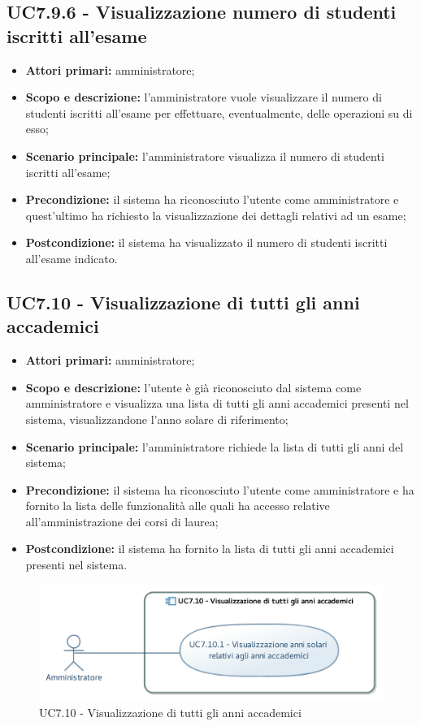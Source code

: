 \documentclass[AnalisiDeiRequisiti.tex]{subfiles}
\begin{document}
\subsection{UC7.9.6 - Visualizzazione numero di studenti iscritti all'esame}
\begin{itemize}
	\item \textbf{Attori primari:} amministratore;
	\item \textbf{Scopo e descrizione:} l'amministratore vuole visualizzare il numero di studenti iscritti all'esame per effettuare, eventualmente, delle operazioni su di esso;
	\item \textbf{Scenario principale:} l'amministratore visualizza il numero di studenti iscritti all'esame;
	\item \textbf{Precondizione:} il sistema ha riconosciuto l'utente come amministratore e quest'ultimo ha richiesto la visualizzazione dei dettagli relativi ad un esame; 
	\item \textbf{Postcondizione:} il sistema ha visualizzato il numero di studenti iscritti all'esame indicato.
\end{itemize}
\subsection{UC7.10 - Visualizzazione di tutti gli anni accademici}
\begin{itemize}
	\item \textbf{Attori primari:} amministratore;
	\item \textbf{Scopo e descrizione:} l'utente è già riconosciuto dal sistema come amministratore e visualizza una lista di tutti gli anni accademici presenti nel sistema, visualizzandone l'anno solare di riferimento;
	\item \textbf{Scenario principale:} l'amministratore richiede la lista di tutti gli anni del sistema;
	\item \textbf{Precondizione:} il sistema ha riconosciuto l'utente come amministratore e ha fornito la lista delle funzionalità alle quali ha accesso relative all'amministrazione dei corsi di laurea;
	\item \textbf{Postcondizione:} il sistema ha fornito la lista di tutti gli anni accademici presenti nel sistema.
\end{itemize}
\begin{figure}[H]
	\centering
	\includegraphics[width=0.7\linewidth]{UC7_10.jpg}
	\caption{UC7.10 - Visualizzazione di tutti gli anni accademici}
	\label{UC7.10 - Visualizzazione di tutti gli anni accademici}
\end{figure}
\end{document}
